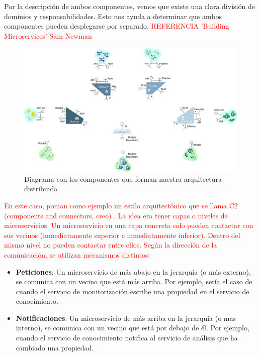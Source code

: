 Por la descripción de ambos componentes, vemos que existe una clara división de dominios y responsabilidades. Esto nos ayuda a determinar que ambos componentes pueden desplegarse por separado. \textcolor{red}{REFERENCIA 'Building Microservices' Sam Newman}

\begin{figure}[htb]
  \centering
  \includegraphics[scale=0.3]{02_arquitectura/images/mape-k-microservices}
  \caption{Diagrama con los componentes que forman nuestra arquitectura distribuida}
  \label{fig:mape-k-microservices}
\end{figure}

\textcolor{red}{En este caso, ponian como ejemplo un estilo arquitectónico que se llama C2 (components and connectors, creo) . La idea era tener capas o niveles de microservicios. Un microservicio en una capa concreta solo pueden contactar con sus vecinos (inmediatamente superior e inmediatamente inferior). Dentro del mismo nivel no pueden contactar entre ellos. Según la dirección de la comunicación, se utilizan mecanismos distintos:}

\begin{itemize}
  \item \textbf{Peticiones}: Un microservicio de más abajo en la jerarquía (o más externo), se comunica con un vecino que está más arriba. Por ejemplo, sería el caso de cuando el servicio de monitorización escribe una propiedad en el servicio de conocimiento.

  \item \textbf{Notificaciones}: Un microservicio de más arriba en la jerarquía (o mas interno), se comunica con un vecino que está por debajo de él. Por ejemplo, cuando el servicio de conocimiento notifica al servicio de análisis que ha cambiado una propiedad.
\end{itemize}

